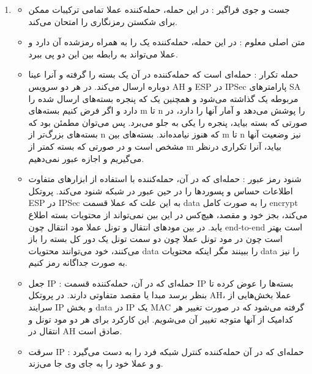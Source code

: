 \begin{enumerate}[label=\alph*)]
\item 
    \begin{itemize}
      \item جست و جوی فراگیر :
      در این حمله، حمله‌کننده عملا تمامی ترکیبات ممکن برای شکستن 
      رمزنگاری را امتحان می‌کند. 
      \item متن اصلی معلوم : 
      در این حمله، حمله‌کننده یک 
      را به همراه رمز‌شده آن دارد و عملا می‌تواند به رابطه بین این دو پی ببرد. 
      \item حمله تکرار : 
      حمله‌ای است که حمله‌کننده در آن یک بسته را گرفته
      و آنرا عینا دوباره ارسال می‌کند. در هر دو سرویس AH 
      و 
      ESP 
      در IPSec 
      پارامترهای SA 
      مربوطه یک 
      گذاشته می‌شود و همچنین یک 
      که پنجره بسته‌های ارسال شده را دارد و اگر فرض کنیم بسته‌های 
      m تا n را پوشش می‌دهد و آمار آنها را دارد، 
      در صورتی که بسته
      بیاید، پنجره را یکی به جلو می‌برد. پس می‌توان مطمئن بود که 
      بسته‌های 
      بزرگ‌تر از n که هنوز نیامده‌اند.
      بسته‌های بین m تا n نیز وضعیت آنها مشخص است و 
      در صورتی که بسته کمتر از m بیاید، آنرا تکراری درنظر می‌گیریم و 
      اجازه عبور نمی‌دهیم.
      \item شنود رمز عبور : 
      حمله‌ای که در آن، حمله‌کننده با استفاده از ابزارهای متفاوت 
      اطلاعات حساس و پسوردها را در حین عبور در شبکه شنود می‌کند. 
      پروتکل ESP در 
      IPSec 
      به این علت که عملا قسمت data را به صورت کامل 
      encrypt می‌کند، 
      بجز خود و مقصد،‌ هیچ‌‌کس در این بین نمی‌تواند از محتویات 
      بسته اطلاع یابد. در بین مودهای انتقال و 
      تونل عملا مود انتقال چون end-to-end است بهتر است چون 
      در مود تونل عملا چون دو سمت تونل یک دور کل بسته را باز می‌کنند، 
      خود می‌توانند محتویات data را ببینند مگر اینکه
      محتویات data را نیز به صورت جداگانه رمز کنیم.
      \item جعل IP : 
      حمله‌ای که در آن، حمله‌کننده قسمت IP بسته‌ها را عوض کرده
      تا بنظر برسد مبدا یا مقصد متفاوتی دارند.
      در پروتکل AH، 
      عملا بخش‌هایی از سرایند IP و 
      بخش data در IP یک MAC گرفته می‌شود که در صورت
      تغییر هر کدامیک از آنها متوجه تغییر آن می‌شویم.
      این کارکرد برای هر دو مود تونل و انتقال در AH 
      صادق است.
      \item سرقت IP : 
        حمله‌ای که در آن حمله‌کننده کنترل شبکه فرد را به دست می‌گیرد و 
        و عملا خود را به جای وی جا می‌زند.


\end{itemize}
\end{enumerate}
